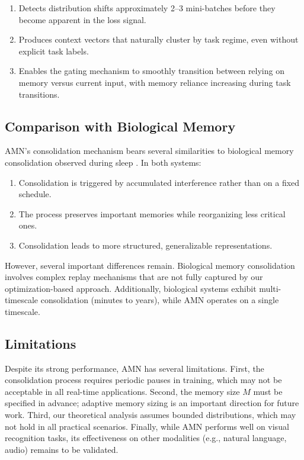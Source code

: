 \documentclass[11pt]{article}
\begin{document}
\begin{enumerate}
    \item Detects distribution shifts approximately 2--3 mini-batches before they become apparent in the loss signal.
    \item Produces context vectors that naturally cluster by task regime, even without explicit task labels.
    \item Enables the gating mechanism to smoothly transition between relying on memory versus current input, with memory reliance increasing during task transitions.
\end{enumerate}

\subsection{Comparison with Biological Memory}

AMN's consolidation mechanism bears several similarities to biological memory consolidation observed during sleep \citep{walker2017sleep}. In both systems:
\begin{enumerate}
    \item Consolidation is triggered by accumulated interference rather than on a fixed schedule.
    \item The process preserves important memories while reorganizing less critical ones.
    \item Consolidation leads to more structured, generalizable representations.
\end{enumerate}

However, several important differences remain. Biological memory consolidation involves complex replay mechanisms that are not fully captured by our optimization-based approach. Additionally, biological systems exhibit multi-timescale consolidation (minutes to years), while AMN operates on a single timescale.

\subsection{Limitations}

Despite its strong performance, AMN has several limitations. First, the consolidation process requires periodic pauses in training, which may not be acceptable in all real-time applications. Second, the memory size $M$ must be specified in advance; adaptive memory sizing is an important direction for future work. Third, our theoretical analysis assumes bounded distributions, which may not hold in all practical scenarios. Finally, while AMN performs well on visual recognition tasks, its effectiveness on other modalities (e.g., natural language, audio) remains to be validated.
\end{document}
